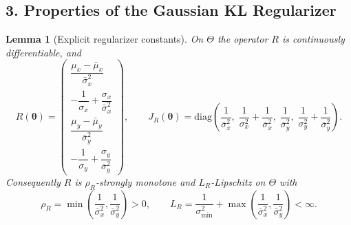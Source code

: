 \documentclass{article}
\newtheorem{lemma}[theorem]{Lemma}
\theoremstyle{definition}
\theoremstyle{remark}
\begin{document}
\subsection*{3. Properties of the Gaussian KL Regularizer}

\begin{lemma}[Explicit regularizer constants]\label{lem:kl}
On $\Theta$ the operator $R$ is continuously differentiable, and
\begin{equation}
R(\boldsymbol{\theta}) = \begin{pmatrix}
\dfrac{\mu_x - \bar\mu_x}{\bar\sigma_x^{2}} \\[2ex]
-\dfrac{1}{\sigma_x} + \dfrac{\sigma_x}{\bar\sigma_x^{2}} \\[2ex]
\dfrac{\mu_y - \bar\mu_y}{\bar\sigma_y^{2}} \\[2ex]
-\dfrac{1}{\sigma_y} + \dfrac{\sigma_y}{\bar\sigma_y^{2}}
\end{pmatrix},
\qquad
J_R(\boldsymbol{\theta}) = \mathrm{diag}\!\left(
\frac{1}{\bar\sigma_x^{2}},\;
\frac{1}{\sigma_x^{2}} + \frac{1}{\bar\sigma_x^{2}},\;
\frac{1}{\bar\sigma_y^{2}},\;
\frac{1}{\sigma_y^{2}} + \frac{1}{\bar\sigma_y^{2}}
\right).
\end{equation}
Consequently $R$ is $\rho_R$-strongly monotone and $L_R$-Lipschitz on $\Theta$ with
\begin{equation}
\rho_R = \min\!\left(\frac{1}{\bar\sigma_x^{2}}, \frac{1}{\bar\sigma_y^{2}}\right) > 0,
\qquad
L_R = \frac{1}{\sigma_{\min}^{2}} + \max\!\left(\frac{1}{\bar\sigma_x^{2}}, \frac{1}{\bar\sigma_y^{2}}\right) < \infty .
\end{equation}
\end{lemma}
\end{document}
